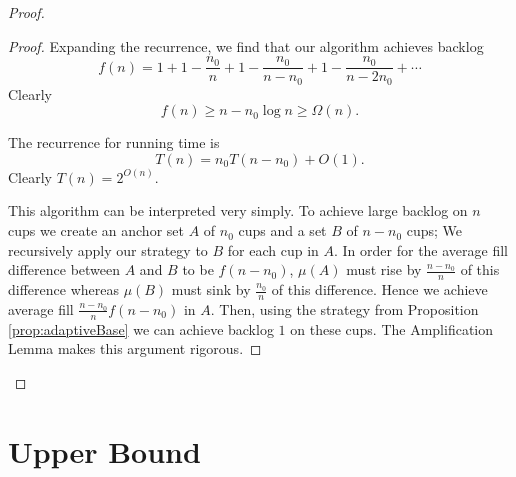 \documentclass[twocolumn]{article}[10pt]
\begin{document}
\begin{proof}
\begin{proof}
    Expanding the recurrence, we find that our algorithm achieves backlog 
    $$f(n) = 1+ 1-\frac{n_0}{n} + 1-\frac{n_0}{n-n_0} + 1-\frac{n_0}{n-2n_0} + \cdots $$
    Clearly 
    $$f(n) \ge n - n_0 \log n \ge \Omega(n).$$

    The recurrence for running time is 
    $$T(n) = n_0T(n-n_0)+O(1).$$
    Clearly $T(n) = 2^{O(n)}$.

    This algorithm can be interpreted very simply. To achieve large backlog on
    $n$ cups we create an anchor set $A$ of $n_0$ cups and a set $B$ of $n-n_0$
    cups; We recursively apply our strategy to $B$ for each cup in $A$. In
    order for the average fill difference between $A$ and $B$ to be $f(n-n_0)$,
    $\mu(A)$ must rise by $\frac{n-n_0}{n}$ of this difference whereas $\mu(B)$
    must sink by $\frac{n_0}{n}$ of this difference. Hence we achieve average
    fill $\frac{n-n_0}{n}f(n-n_0)$ in $A$. Then, using the strategy from
    Proposition \ref{prop:adaptiveBase} we can achieve backlog $1$ on these
    cups. The Amplification Lemma makes this argument rigorous.


  \end{proof}


\end{proof}

\section{Upper Bound}\label{sec:adaptiveUpperBound}
\end{document}
